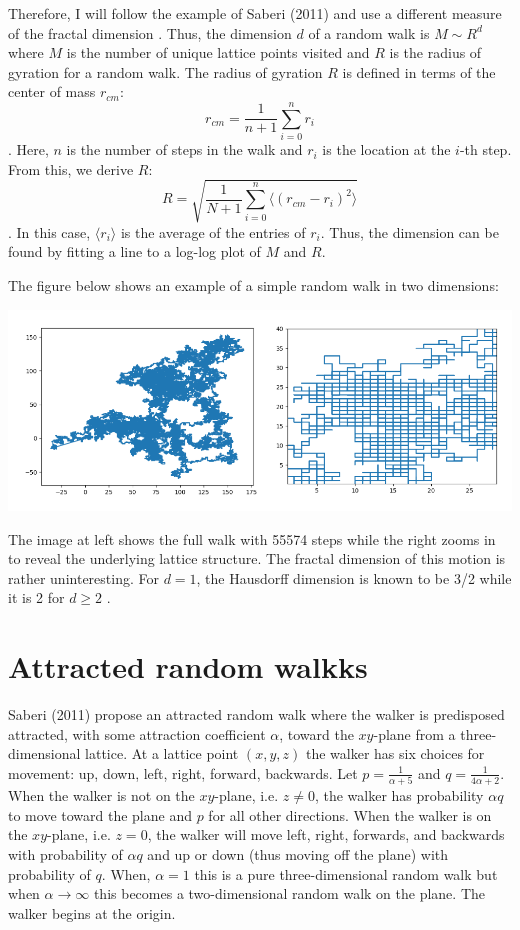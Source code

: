 \documentclass{article}
\begin{document}
Therefore, I will follow the example of Saberi (2011) and use a different measure of the fractal dimension \cite{saberi11}. Thus, the dimension $d$ of a random walk is $M \sim R^d$ where $M$ is the number of unique lattice points visited and $R$ is the radius of gyration for a random walk. The radius of gyration $R$ is defined in terms of the center of mass $r_{cm}$: 
\begin{equation}
r_{cm} = \frac{1}{n+1} \sum_{i=0}^n r_i 
\end{equation}. Here, $n$ is the number of steps in the walk and $r_i$ is the location at the $i$-th step. From this, we derive $R$:
\begin{equation}
R = \sqrt{\frac{1}{N+1} \sum_{i=0}^n \langle (r_{cm} - r_i )^2 \rangle} 
\end{equation}. 
In this case, $\langle r_i \rangle$ is the average of the entries of $r_i$. Thus, the dimension can be found by fitting a line to a log-log plot of $M$ and $R$. 

The figure below shows an example of a simple random walk in two dimensions:

\includegraphics[scale=0.5]{figs/simplewalk}

The image at left shows the full walk with 55574 steps while the right zooms in to reveal the underlying lattice structure. The fractal dimension of this motion is rather uninteresting. For $d=1$, the Hausdorff dimension is known to be 3/2 while it is 2 for $d \ge 2$ \cite{saberi11}. 

\section{Attracted random walkks}
Saberi (2011) propose an attracted random walk where the walker is predisposed attracted, with some attraction coefficient $\alpha$, toward the $xy$-plane from a three-dimensional lattice. At a lattice point $(x,y,z)$ the walker has six choices for movement: up, down, left, right, forward, backwards. Let $p = \frac{1}{\alpha + 5}$ and $q = \frac{1}{4 \alpha + 2}$. When the walker is not on the $xy$-plane, i.e. $z\not = 0$, the walker has probability $\alpha q$ to move toward the plane and $p$ for all other directions. When the walker is on the $xy$-plane, i.e. $z=0$, the walker will move left, right, forwards, and backwards with probability of $\alpha q$ and up or down (thus moving off the plane) with probability of $q$. When, $\alpha = 1$ this is a pure three-dimensional random walk but when $\alpha \to \infty$ this becomes a two-dimensional random walk on the plane. The walker begins at the origin. 
\end{document}
